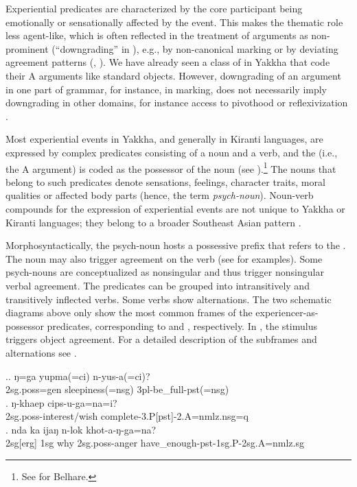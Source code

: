 
\noindent
Experiential predicates are characterized by the core participant being emotionally or sensationally affected by the event. This makes the thematic role  less agent-like, which is often reflected in the treatment of  arguments as non-prominent (“downgrading” in \citealt{Bickel2004The-syntax}), e.g., by non-canonical  marking or by deviating agreement patterns (\citealt[22]{Levinetal2005_Argument}, \citealt[185]{Naess2007_Prototypical}). We have already seen a class of  in Yakkha that code their A arguments like standard objects. However, downgrading of an argument in one part of grammar, for instance, in  marking, does not necessarily imply downgrading in other domains, for instance access to pivothood or reflexivization \citep[77]{Bickel2004The-syntax}.

Most experiential events in Yakkha, and generally in Kiranti languages, are expressed by complex predicates consisting of a noun and a verb, and the 
 (i.e., the A argument) is coded as the possessor of the noun (see ).\footnote{See \citet{Bickel1997The-possessive} for Belhare.} 
The nouns that belong to such predicates denote sensations,  feelings,  character traits, moral qualities or affected body parts (hence, the term \emph{psych-noun}). 
Noun-verb compounds for the expression of experiential events are not unique to Yakkha or Kiranti languages; they belong to a broader Southeast Asian 
pattern \citep{Matisoff1986Hearts}. 

Morphosyntactically, the psych-noun hosts a possessive prefix that refers to the . The noun may also trigger agreement on the verb (see \Next for examples). Some psych-nouns are conceptualized as nonsingular and thus trigger nonsingular verbal agreement. The predicates can be grouped into intransitively and transitively inflected verbs. Some verbs show alternations. The two schematic diagrams above only show the most common frames  of the ex\-pe\-ri\-enc\-er-as-possessor predicates, corresponding to \Next[a] and \Next[b], respectively. In \Next[c], the stimulus triggers object agreement. For a  detailed description of the subframes and alternations see .

\ex.\ag. ŋ=ga yupma(=ci) n-yus-a(=ci)?\\	
		{\sc 2sg.poss=gen} sleepiness{\sc (=nsg)} 	{\sc 3pl}-be\_full{\sc -pst(=nsg)}\\
		\bg. ŋ-khaep cips-u-ga=na=i?\\
	{\sc 2sg.poss-}interest/wish complete{\sc -3.P[pst]-2.A=nmlz.nsg=q}\\
	\bg. nda ka ijaŋ n-lok khot-a-ŋ-ga=na?\\
	{\sc 2sg[erg]} {\sc 1sg} why {\sc 2sg.poss}-anger have\_enough{\sc -pst-1sg.P-2sg.A=nmlz.sg}\\


